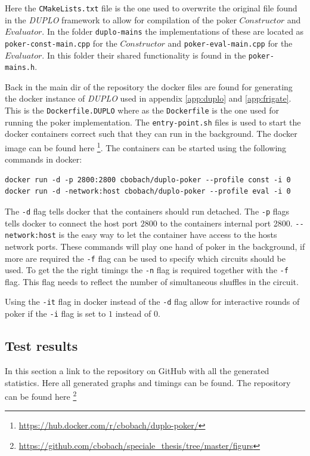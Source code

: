 \documentclass[twoside,11pt,openright]{report}
\newcommand{\DUPLO}{\textit{DUPLO} }
\begin{document}
\begin{appendices}
Here the \verb|CMakeLists.txt| file is the one used to overwrite the original file found in the \DUPLO framework to allow for compilation of the poker $Constructor$ and $Evaluator$. In the folder \verb|duplo-mains| the implementations of these are located as \verb|poker-const-main.cpp| for the $Constructor$ and \verb|poker-eval-main.cpp| for the $Evaluator$. In this folder their shared functionality is found in the \verb|poker-mains.h|.

\bigskip

Back in the main dir of the repository the docker files are found for generating the docker instance of \DUPLO used in appendix \ref{app:duplo} and \ref{app:frigate}. This is the \verb|Dockerfile.DUPLO| where as the \verb|Dockerfile| is the one used for running the poker implementation. The \verb|entry-point.sh| files is used to start the docker containers correct such that they can run in the background. The docker image can be found here \footnote{\url{https://hub.docker.com/r/cbobach/duplo-poker/}}. The containers can be started using the following commands in docker:

\begin{center}
\begin{verbatim}
docker run -d -p 2800:2800 cbobach/duplo-poker --profile const -i 0
docker run -d -network:host cbobach/duplo-poker --profile eval -i 0
\end{verbatim}
\end{center}

The \verb|-d| flag tells docker that the containers should run detached. The \verb|-p| flags tells docker to connect the host port $2800$ to the containers internal port 2800. \verb|--network:host| is the easy way to let the container have access to the hosts network ports. These commands will play one hand of poker in the background, if more are required the \verb|-f| flag can be used to specify which circuits should be used. To get the the right timings the \verb|-n| flag is required together with the \verb|-f| flag. This flag needs to reflect the number of simultaneous shuffles in the circuit.

Using the \verb|-it| flag in docker instead of the \verb|-d| flag allow for interactive rounds of poker if the \verb|-i| flag is set to $1$ instead of $0$.


\subsection{Test results}
\label{app:test-res}
In this section a link to the repository on GitHub with all the generated statistics. Here all generated graphs and timings can be found. The repository can be found here \footnote{\url{https://github.com/cbobach/speciale_thesis/tree/master/figurs}}


\end{appendices}
\end{document}
